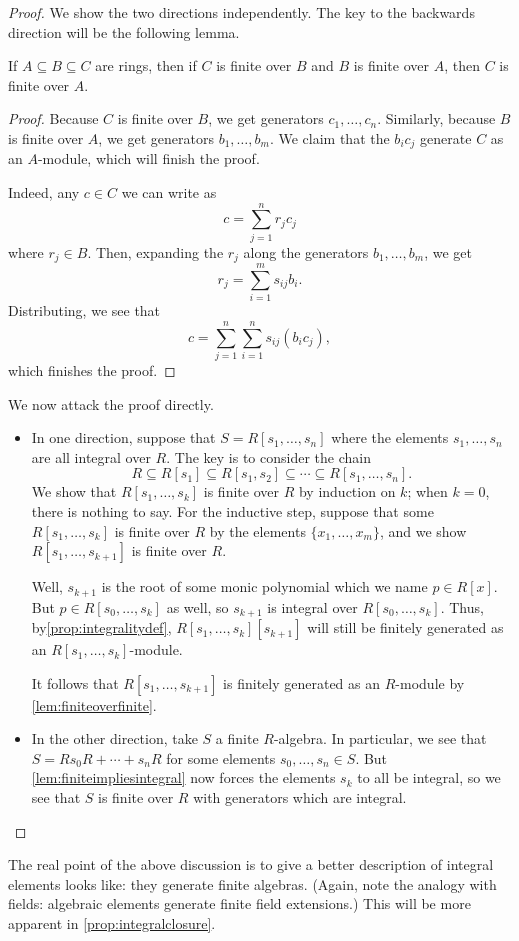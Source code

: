 \begin{proof}
	We show the two directions independently. The key to the backwards direction will be the following lemma.
	\begin{lemma} \label{lem:finiteoverfinite}
		If $A\subseteq B\subseteq C$ are rings, then if $C$ is finite over $B$ and $B$ is finite over $A$, then $C$ is finite over $A$.
	\end{lemma}
	\begin{proof}
		Because $C$ is finite over $B$, we get generators $c_1,\ldots,c_n$. Similarly, because $B$ is finite over $A$, we get generators $b_1,\ldots,b_m$. We claim that the $b_ic_j$ generate $C$ as an $A$-module, which will finish the proof.

		Indeed, any $c\in C$ we can write as
		\[c=\sum_{j=1}^nr_jc_j\]
		where $r_j\in B$. Then, expanding the $r_j$ along the generators $b_1,\ldots,b_m$, we get
		\[r_j=\sum_{i=1}^ms_{ij}b_i.\]
		Distributing, we see that
		\[c=\sum_{j=1}^n\sum_{i=1}^ns_{ij}(b_ic_j),\]
		which finishes the proof.
	\end{proof}
	We now attack the proof directly.
	\begin{itemize}
		\item In one direction, suppose that $S=R[s_1,\ldots,s_n]$ where the elements $s_1,\ldots,s_n$ are all integral over $R$. The key is to consider the chain
		\[R\subseteq R[s_1]\subseteq R[s_1,s_2]\subseteq\cdots\subseteq R[s_1,\ldots,s_n].\]
		We show that $R[s_1,\ldots,s_k]$ is finite over $R$ by induction on $k$; when $k=0$, there is nothing to say. For the inductive step, suppose that some $R[s_1,\ldots,s_k]$ is finite over $R$ by the elements $\{x_1,\ldots,x_m\}$, and we show $R[s_1,\ldots,s_{k+1}]$ is finite over $R$.
		
		Well, $s_{k+1}$ is the root of some monic polynomial which we name $p\in R[x]$. But $p\in R[s_0,\ldots,s_k]$ as well, so $s_{k+1}$ is integral over $R[s_0,\ldots,s_k]$. Thus, by\autoref{prop:integralitydef}, $R[s_1,\ldots,s_k][s_{k+1}]$ will still be finitely generated as an $R[s_1,\ldots,s_k]$-module.

		It follows that $R[s_1,\ldots,s_{k+1}]$ is finitely generated as an $R$-module by \autoref{lem:finiteoverfinite}.

		\item In the other direction, take $S$ a finite $R$-algebra. In particular, we see that $S=Rs_0R+\cdots+s_nR$ for some elements $s_0,\ldots,s_n\in S$. But \autoref{lem:finiteimpliesintegral} now forces the elements $s_k$ to all be integral, so we see that $S$ is finite over $R$ with generators which are integral.
		\qedhere
	\end{itemize}
\end{proof}
\begin{remark}[Nir]
	The real point of the above discussion is to give a better description of integral elements looks like: they generate finite algebras. (Again, note the analogy with fields: algebraic elements generate finite field extensions.) This will be more apparent in \autoref{prop:integralclosure}.
\end{remark}

